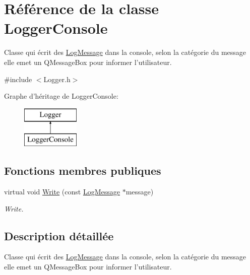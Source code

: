 \hypertarget{class_logger_console}{\section{Référence de la classe Logger\-Console}
\label{class_logger_console}
}


Classe qui écrit des \hyperlink{class_log_message}{Log\-Message} dans la console, selon la catégorie du message elle emet un Q\-Message\-Box pour informer l'utilisateur.  




{\ttfamily \#include $<$Logger.\-h$>$}

Graphe d'héritage de Logger\-Console\-:\begin{figure}[H]
\begin{center}
\leavevmode
\includegraphics[height=2.000000cm]{class_logger_console}
\end{center}
\end{figure}
\subsection*{Fonctions membres publiques}
\begin{DoxyCompactItemize}
\item 
virtual void \hyperlink{class_logger_console_a9ce9d2e57b1c8a097aebb518d0b40496}{Write} (const \hyperlink{class_log_message}{Log\-Message} $\ast$message)
\begin{DoxyCompactList}\small\item\em Write. \end{DoxyCompactList}\end{DoxyCompactItemize}


\subsection{Description détaillée}
Classe qui écrit des \hyperlink{class_log_message}{Log\-Message} dans la console, selon la catégorie du message elle emet un Q\-Message\-Box pour informer l'utilisateur. 

